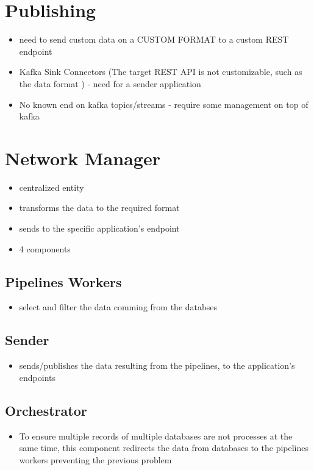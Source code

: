 \section{Publishing}

\begin{itemize}
    \item need to send custom data on a CUSTOM FORMAT to a custom REST endpoint
    \item Kafka Sink Connectors (The target REST API is not customizable, such as the data format ) - need for a sender application
    \item No known end on kafka topics/streams - require some management on top of kafka
\end{itemize}

\section{Network Manager}  %
\begin{itemize}
    \item centralized entity
    \item transforms the data to the required format
    \item sends to the specific application's endpoint
    \item 4 components
\end{itemize}

\subsection{Pipelines Workers}
\begin{itemize}
    \item select and filter the data comming from the databses
\end{itemize}
\subsection{Sender}
\begin{itemize}
    \item sends/publishes the data resulting from the pipelines, to the application's endpoints
\end{itemize}
\subsection{Orchestrator}
\begin{itemize}
    \item To ensure multiple records of multiple databases are not processes at the same time, this component redirects the data from databases to the pipelines workers preventing the previous problem
\end{itemize}
